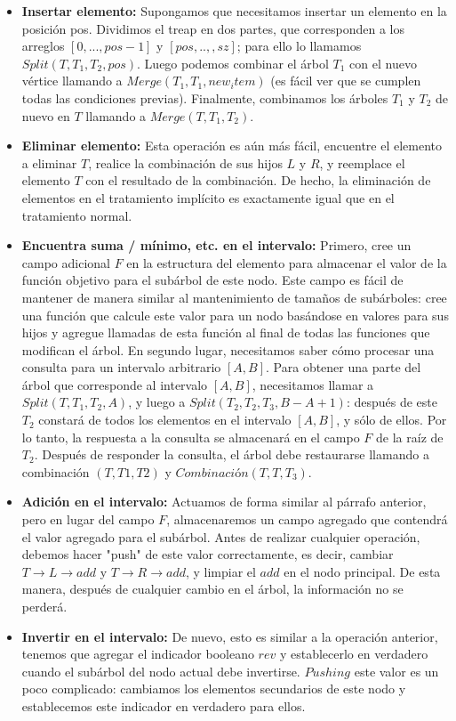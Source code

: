 \documentclass[12pt]{article}
\begin{document}
\begin{itemize}
	\item \textbf{Insertar elemento:} Supongamos que necesitamos insertar un elemento en la posición pos. Dividimos el treap en dos partes, que corresponden a los arreglos $[0, ..., pos-1]$ y $[pos, .., , sz]$; para ello lo llamamos $Split(T, T_1, T_2, pos)$. Luego podemos combinar el árbol $T_1$ con el nuevo vértice llamando a $Merge(T_1, T_1, new_item)$ (es fácil ver que se cumplen todas las condiciones previas). Finalmente, combinamos los árboles $T_1$ y $T_2$ de nuevo en $T$ llamando a $Merge(T, T_1, T_2)$.
	\item \textbf{Eliminar elemento:} Esta operación es aún más fácil, encuentre el elemento a eliminar $T$, realice la combinación de sus hijos $L$ y $R$, y reemplace el elemento $T$ con el resultado de la combinación. De hecho, la eliminación de elementos en el tratamiento implícito es exactamente igual que en el tratamiento normal.
	\item \textbf{Encuentra suma / mínimo, etc. en el intervalo:} Primero, cree un campo adicional $F$ en la estructura del elemento para almacenar el valor de la función objetivo para el subárbol de este nodo. Este campo es fácil de mantener de manera similar al mantenimiento de tamaños de subárboles: cree una función que calcule este valor para un nodo basándose en valores para sus hijos y agregue llamadas de esta función al final de todas las funciones que modifican el árbol.
	En segundo lugar, necesitamos saber cómo procesar una consulta para un intervalo arbitrario $[A, B]$. Para obtener una parte del árbol que corresponde al intervalo $[A, B]$, necesitamos llamar a $Split(T, T_1, T_2, A)$, y luego a $Split(T_2, T_2, T_3, B - A + 1)$: después de este $T_2$ constará de todos los elementos en el intervalo $[A, B]$, y sólo de ellos. Por lo tanto, la respuesta a la consulta se almacenará en el campo $F$ de la raíz de $T_2$. Después de responder la consulta, el árbol debe restaurarse llamando a combinación $(T, T1, T2)$ y $Combinación(T, T, T_3)$.
	\item \textbf{Adición en el intervalo:} Actuamos de forma similar al párrafo anterior, pero en lugar del campo $F$, almacenaremos un campo agregado que contendrá el valor agregado para el subárbol. Antes de realizar cualquier operación, debemos hacer "push" de este valor correctamente, es decir, cambiar $T \rightarrow L \rightarrow add$ y $T \rightarrow R \rightarrow add$, y limpiar el $add$ en el nodo principal. De esta manera, después de cualquier cambio en el árbol, la información no se perderá.
	\newpage
	\item \textbf{Invertir en el intervalo:} De nuevo, esto es similar a la operación anterior, tenemos que agregar el indicador booleano $rev$ y establecerlo en verdadero cuando el subárbol del nodo actual debe invertirse. $Pushing$ este valor es un poco complicado: cambiamos los elementos secundarios de este nodo y establecemos este indicador en verdadero para ellos.
\end{itemize}
\end{document}
